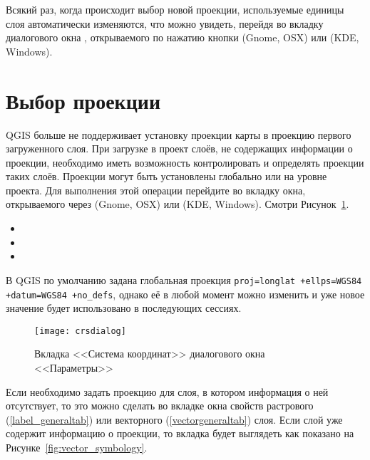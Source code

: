 Всякий раз, когда происходит выбор новой проекции, используемые единицы
слоя автоматически изменяются, что можно увидеть, перейдя во вкладку
 диалогового окна , открываемого по нажатию кнопки  (Gnome,
OSX) или  (KDE, Windows).

\section{Выбор проекции}
\label{sec:projection-specifying}

QGIS больше не поддерживает установку проекции карты в проекцию
первого загруженного слоя. При загрузке в проект слоёв, не содержащих
информации о проекции, необходимо иметь возможность контролировать и
определять проекции таких слоёв. Проекции могут быть установлены глобально
или на уровне проекта. Для выполнения этой операции перейдите во вкладку
 окна, открываемого через 
\arrow {} (Gnome, OSX) или
 \arrow {} (KDE,
Windows). Смотри Рисунок~\ref{fig:crsdialog}.

\begin{itemize}[label=--]
\item {}
\item {}
\item {}
\end{itemize}

В QGIS по умолчанию задана глобальная проекция \texttt{proj=longlat +ellps=WGS84
+datum=WGS84 +no\_defs}, однако её в любой момент можно изменить и уже новое
значение будет использовано в последующих сессиях.

\begin{figure}[ht]
   \centering
   \texttt{[image: crsdialog]}
   \caption{Вкладка <<Система координат>> диалогового окна <<Параметры>> \nixcaption}\label{fig:crsdialog}
\end{figure}

Если необходимо задать проекцию для слоя, в котором информация о ней
отсутствует, то это можно сделать во вкладке  окна свойств растрового
(\ref{label_generaltab}) или векторного (\ref{vectorgeneraltab}) слоя. Если
слой уже содержит информацию о проекции, то вкладка будет выглядеть как показано
на Рисунке~\ref{fig:vector_symbology}.

